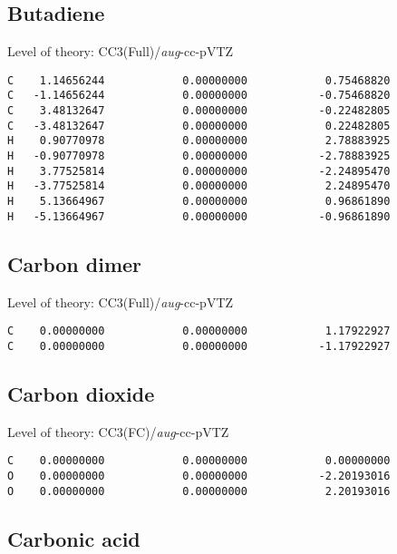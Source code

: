 \documentclass[journal=jctcce,manuscript=article,layout=traditional]{achemso}
\newcommand{\AVTZ}{\emph{aug}-cc-pVTZ}
\begin{document}
\subsection*{Butadiene}

\begin{singlespace}
Level of theory: CC3(Full)/{\AVTZ}
\begin{verbatim}
C    1.14656244            0.00000000            0.75468820
C   -1.14656244            0.00000000           -0.75468820
C    3.48132647            0.00000000           -0.22482805
C   -3.48132647            0.00000000            0.22482805 
H    0.90770978            0.00000000            2.78883925 
H   -0.90770978            0.00000000           -2.78883925 
H    3.77525814            0.00000000           -2.24895470 
H   -3.77525814            0.00000000            2.24895470 
H    5.13664967            0.00000000            0.96861890 
H   -5.13664967            0.00000000           -0.96861890 
\end{verbatim}
\end{singlespace}

\subsection*{Carbon dimer}

\begin{singlespace}
Level of theory: CC3(Full)/{\AVTZ}
\begin{verbatim}
C    0.00000000            0.00000000            1.17922927
C    0.00000000            0.00000000           -1.17922927
\end{verbatim}
\end{singlespace}

\subsection*{Carbon dioxide}

\begin{singlespace}
Level of theory: CC3(FC)/{\AVTZ}
\begin{verbatim}
C    0.00000000            0.00000000            0.00000000
O    0.00000000            0.00000000           -2.20193016
O    0.00000000            0.00000000            2.20193016
\end{verbatim}
\end{singlespace}

\subsection*{Carbonic acid}
\end{document}
